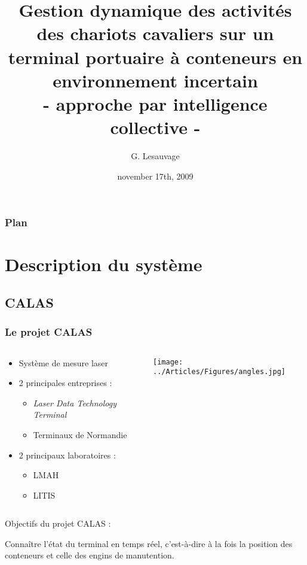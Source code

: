 \documentclass{beamer}
\date{\tiny november 17th, 2009}
\title[MajecSTIC 2009]
{
	Gestion dynamique des activités des chariots cavaliers sur un terminal portuaire à conteneurs en environnement incertain\\
	- approche par intelligence collective -
}
\author
{
	G. Lesauvage
}
\institute[UFR ST Le Havre]
{
	
 \begin{columns}
 		\begin{column}[l]{6cm}
 			\begin{center}
 			\texttt{[image: ../Articles/Figures/logouniversiteduhavre.png]} \\
 			\tiny\textit{Unit\'{e} de Formation et de Recherche des Sciences et Techniques}
 			\end{center}
 		\end{column}
 		\begin{column}[r]{6cm}
 			\begin{center}
 			\texttt{[image: ../Articles/Figures/logolitis.png]} \\
 			\tiny\textit{Laboratoire d'Informatique et du Traitement de l'Information et des Syst\`{e}mes}
 			\end{center}
 		\end{column}
 	\end{columns}

 	
}
\begin{document}
\begin{frame}
\titlepage
\end{frame}

\begin{frame}
\frametitle{Plan}
\tableofcontents
\end{frame}


\section{Description du système}
\subsection*{CALAS}
\begin{frame}
\frametitle{Le projet CALAS}
\begin{columns}
    \begin{column}[l]{5.5cm}	
	\begin{itemize}
		\item Système de mesure laser
		\item 2 principales entreprises : 
			\begin{itemize}
			 \item \textit{Laser Data Technology Terminal}
	 		 \item Terminaux de Normandie
			\end{itemize}
		
		 \item 2 principaux laboratoires : 
			 \begin{itemize}
			    \item LMAH
			    \item LITIS
			  \end{itemize}
	\end{itemize}
    \end{column}
    \begin{column}[r]{4.5cm}
		\begin{flushright}
		  \texttt{[image: ../Articles/Figures/angles.jpg]}
		\end{flushright}
    \end{column}
 \end{columns}	
	\begin{block}{Objectifs du projet CALAS : }
		\begin{minipage}[]{\columnwidth}
			Connaître l'état du terminal en temps réel, c'est-à-dire à la fois la position des conteneurs et celle des engins de manutention.
		\end{minipage}
	\end{block}
	

\end{frame}
\end{document}
